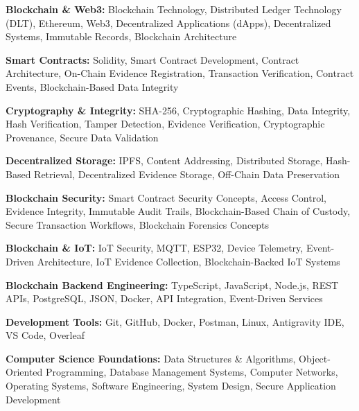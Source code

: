 \documentclass[a4paper,11pt]{article}
\begin{document}
\begin{itemize}[leftmargin=0in, label={}]

\small{

\item{
\textbf{Blockchain \& Web3:} Blockchain Technology, Distributed Ledger Technology (DLT), Ethereum, Web3, Decentralized Applications (dApps), Decentralized Systems, Immutable Records, Blockchain Architecture
}

\item{
\textbf{Smart Contracts:} Solidity, Smart Contract Development, Contract Architecture, On-Chain Evidence Registration, Transaction Verification, Contract Events, Blockchain-Based Data Integrity
}

\item{
\textbf{Cryptography \& Integrity:} SHA-256, Cryptographic Hashing, Data Integrity, Hash Verification, Tamper Detection, Evidence Verification, Cryptographic Provenance, Secure Data Validation
}

\item{
\textbf{Decentralized Storage:} IPFS, Content Addressing, Distributed Storage, Hash-Based Retrieval, Decentralized Evidence Storage, Off-Chain Data Preservation
}

\item{
\textbf{Blockchain Security:} Smart Contract Security Concepts, Access Control, Evidence Integrity, Immutable Audit Trails, Blockchain-Based Chain of Custody, Secure Transaction Workflows, Blockchain Forensics Concepts
}

\item{
\textbf{Blockchain \& IoT:} IoT Security, MQTT, ESP32, Device Telemetry, Event-Driven Architecture, IoT Evidence Collection, Blockchain-Backed IoT Systems
}

\item{
\textbf{Blockchain Backend Engineering:} TypeScript, JavaScript, Node.js, REST APIs, PostgreSQL, JSON, Docker, API Integration, Event-Driven Services
}

\item{
\textbf{Development Tools:} Git, GitHub, Docker, Postman, Linux, Antigravity IDE, VS Code, Overleaf
}

\item{
\textbf{Computer Science Foundations:} Data Structures \& Algorithms, Object-Oriented Programming, Database Management Systems, Computer Networks, Operating Systems, Software Engineering, System Design, Secure Application Development
}

}

\end{itemize}
\end{document}
